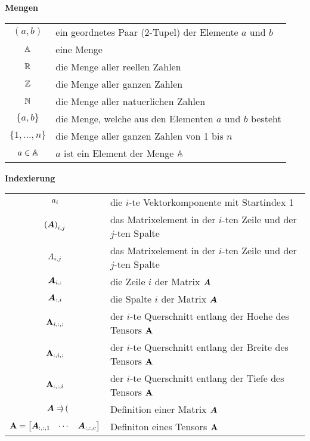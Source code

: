 \begin{center}\textbf{Mengen}\end{center}
\begin{tabular}{cl}
  $(a,b)$ & ein geordnetes Paar (2-Tupel) der Elemente $a$ und $b$ \\
  $\mathbb{A}$ & eine Menge \\
  $\mathbb{R}$ & die Menge aller reellen Zahlen \\
  $\mathbb{Z}$ & die Menge aller ganzen Zahlen \\
  $\mathbb{N}$ & die Menge aller natuerlichen Zahlen \\
  $\{a,b\}$ & die Menge, welche aus den Elementen $a$ und $b$ besteht \\
  $\{1,\ldots,n\}$ & die Menge aller ganzen Zahlen von 1 bis $n$ \\
  $a \in \mathbb{A}$ & $a$ ist ein Element der Menge $\mathbb{A}$ \\

\end{tabular}

\begin{center}\textbf{Indexierung}\end{center}
\begin{tabular}{cl}
  $a_i$ & die $i$-te Vektorkomponente mit Startindex 1 \\
  ${(\bm{A})}_{i,j}$ & das Matrixelement in der $i$-ten Zeile und der $j$-ten Spalte \\
  $\mathit{A}_{i,j}$ & das Matrixelement in der $i$-ten Zeile und der $j$-ten Spalte \\
  $\bm{A}_{i,:}$ & die Zeile $i$ der Matrix $\bm{A}$ \\
  $\bm{A}_{:,i}$ & die Spalte $i$ der Matrix $\bm{A}$\ \\
  $\mathbf{A}_{i,:,:}$ & der $i$-te Querschnitt entlang der Hoehe des Tensors $\mathbf{A}$ \\
  $\mathbf{A}_{:,i,:}$ & der $i$-te Querschnitt entlang der Breite des Tensors $\mathbf{A}$ \\
  $\mathbf{A}_{:,:,i}$ & der $i$-te Querschnitt entlang der Tiefe des Tensors $\mathbf{A}$ \\
  $\bm{A} = \begin{pmatrix} \end{pmatrix}$ & Definition einer Matrix $\bm{A}$ \\
  $\mathbf{A} = \begin{bmatrix} \bm{A}_{:,:,1} & \cdots & \bm{A}_{:,:,c} \end{bmatrix}$ & Definiton eines Tensors $\mathbf{A}$ \\

\end{tabular}

